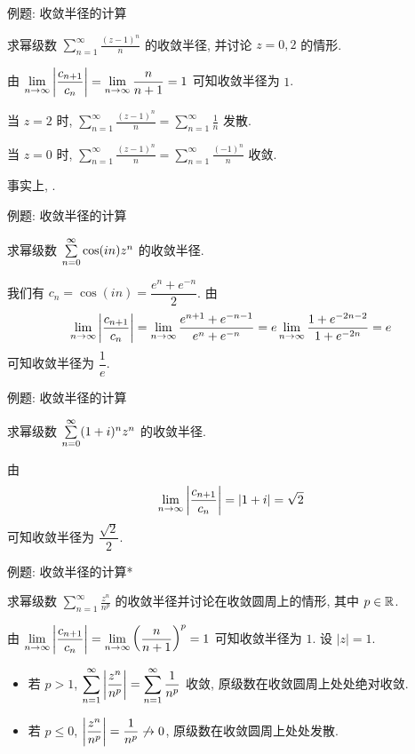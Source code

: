 \begin{frame}{例题: 收敛半径的计算}
\begin{example}
求幂级数 $\displaystyle\sum_{n=1}^\infty\frac{(z-1)^n}n$ 的收敛半径, 并讨论 $z=0,2$ 的情形.
\end{example}
\begin{solution}
由 $\displaystyle\lim_{n\to\infty}\left|\frac{c_{n+1}}{c_n}\right|=\lim_{n\to\infty}\frac n{n+1}=1$ 可知收敛半径为 $1$.

\onslide<+->
当 $z=2$ 时, $\displaystyle\sum_{n=1}^\infty\frac{(z-1)^n}n=\sum_{n=1}^\infty\frac1n$ 发散.

\onslide<+->
当 $z=0$ 时, $\displaystyle\sum_{n=1}^\infty\frac{(z-1)^n}n=\sum_{n=1}^\infty\frac{(-1)^n}n$ 收敛.
\end{solution}
\onslide<+->
事实上, .
\end{frame}


\begin{frame}{例题: 收敛半径的计算}
\begin{example}
求幂级数 $\sum\limits_{n=0}^\infty\cos(in)z^n$ 的收敛半径.
\end{example}
\begin{solution}
我们有 $c_n=\cos(in)=\dfrac{e^n+e^{-n}}2$.
\onslide<+->
由
\[\lim_{n\to\infty}\left|\frac{c_{n+1}}{c_n}\right|=\lim_{n\to\infty}\frac{e^{n+1}+e^{-n-1}}{e^n+e^{-n}}=e\lim_{n\to\infty}\frac{1+e^{-2n-2}}{1+e^{-2n}}=e\]
可知收敛半径为 $\dfrac1e$.
\end{solution}
\end{frame}


\begin{frame}{例题: 收敛半径的计算}
\begin{example}
求幂级数 $\sum\limits_{n=0}^\infty(1+i)^nz^n$ 的收敛半径.
\end{example}
\begin{solution}
由 
\[\lim_{n\to\infty}\left|\frac{c_{n+1}}{c_n}\right|=|1+i|=\sqrt2\] 可知收敛半径为 $\dfrac{\sqrt2}2$.
\end{solution}
\end{frame}


\begin{frame}{例题: 收敛半径的计算*}
\begin{example}
求幂级数 $\displaystyle\sum_{n=1}^\infty\frac{z^n}{n^p}$ 的收敛半径并讨论在收敛圆周上的情形, 其中 $p\in{\mathbb{R}}$.
\end{example}
\begin{solutions}
由 $\displaystyle\lim_{n\to\infty}\left|\frac{c_{n+1}}{c_n}\right|=\lim_{n\to\infty}\left(\frac n{n+1}\right)^p=1$ 可知收敛半径为 $1$.
\onslide<+->
设 $|z|=1$.
\begin{itemize}
\item 若 $p>1$, $\displaystyle\sum_{n=1}^\infty\left|\frac{z^n}{n^p}\right|=\sum_{n=1}^\infty\frac1{n^p}$ 收敛,
\onslide<+->
原级数在收敛圆周上处处绝对收敛.
\item 若 $p\le 0$, $\left|\dfrac{z^n}{n^p}\right|=\dfrac1{n^p}\not\to0$,
\onslide<+->
原级数在收敛圆周上处处发散.
\end{itemize}
\end{solutions}
\end{frame}



